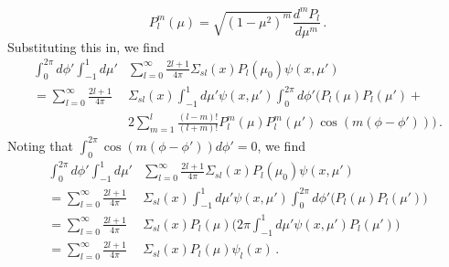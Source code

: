 \begin{equation}
 P^m_l(\mu) = \sqrt{(1-\mu^2)^m} \frac{d^m P_l}{d\mu^m} \, .
\end{equation}
Substituting this in, we find
\begin{equation}
\begin{split}
   \int^{2\pi}_0 d\phi' \int^1_{-1} d\mu'  & \sum^{\infty}_{l=0} \frac{2l+1}{4\pi}  \Sigma_{sl}(x)P_{l}(\mu_0) \psi(x,\mu') \\
  = \sum^{\infty}_{l=0} \frac{2l+1}{4\pi} & \Sigma_{sl}(x) \int^1_{-1} d\mu'  \psi(x,\mu')   \int^{2\pi}_0 d\phi' \Bigg ( P_l(\mu)P_l(\mu') + \\  
  & 2\sum^l_{m=1}\frac{(l-m)!}{(l+m)!}P^m_l(\mu)P^m_l(\mu')\cos(m(\phi-\phi'))\Bigg )\, .
\end{split}
\end{equation}
Noting that $ \int^{2\pi}_{0} \cos(m(\phi-\phi')) d\phi' = 0$, we find
 \begin{equation}
\begin{split}
   \int^{2\pi}_0 d\phi' \int^1_{-1} d\mu'  & \sum^{\infty}_{l=0} \frac{2l+1}{4\pi}  \Sigma_{sl}(x)P_{l}(\mu_0) \psi(x,\mu') \\
  = \sum^{\infty}_{l=0} \frac{2l+1}{4\pi} & \Sigma_{sl}(x) \int^1_{-1} d\mu'  \psi(x,\mu')   \int^{2\pi}_0 d\phi' \Big ( P_l(\mu)P_l(\mu') \Big ) \\
  = \sum^{\infty}_{l=0} \frac{2l+1}{4\pi} & \Sigma_{sl}(x)  P_l(\mu) \Bigg( 2\pi \int^1_{-1} d\mu'  \psi(x,\mu') P_l(\mu')\Bigg )  \\
  = \sum^{\infty}_{l=0} \frac{2l+1}{4\pi} & \Sigma_{sl}(x)  P_l(\mu) \psi_l(x)  \, .
\end{split}
\label{eq:simplescatter}
\end{equation}

